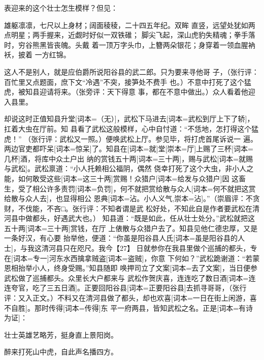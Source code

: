 \documentclass[UTF8,scheme=chinese,11pt,linespread=1.4]{ctexbook}
\makeatletter
\newcommand{\banben}[2][]{#2}
\newenvironment{diben}[1]
  {\list{}{\listparindent 2em
    \itemindent\listparindent
    \rightmargin 0em  %
    \leftmargin 0em  %
    \parsep \z@ \@plus\p@}%
   \item\relax}
  {\endlist}
\makeatother
\begin{document}
\begin{diben}
单表迎来的这个壮士怎生模样？但见：

雄躯凛凛，七尺以上身材；阔面稜稜，二十四五年纪。双眸
直竖，远望处犹如两点明星；两手握来，近觑时好似一双铁碓；
脚尖飞起，深山虎豹失精魂；拳手落时，穷谷熊黑皆丧魄。头戴
着一顶万字头巾，上簪两朵银花；身穿着一领血腥衲袄，披着
一方红锦。

\noindent 这人不是别人，就是应伯爵所说阳谷县的武二郎。只为要来寻他哥
子，（张行评：百忙里又点题面，庶下文“冷遇”不突，接笋处不费手
也。）不意中打死了这个猛虎，被知县迎请将来。（张旁评：天下得意
事，都在不意中做出。）众人看着他迎入县里。

\banben{却说这时正值知县升堂}[词本={（无）}]，\banben{武松下马进去}[词本={武松到厅上下了轿}]，扛着大虫在厅前。知
县看了武松这般模样，心中自忖道：“不恁地，怎打得这个猛虎！”
（张行评：武松又一照。）便唤武松上厅。参见毕，将打虎首尾诉说一
遍。两边官吏都\banben{吓呆}[词本={惊呆}]了。知县\banben{在}[词本={就}]\banben{堂}[崇本={厅}]上赐了\banben{三杯}[词本={几杯}]酒，将库中众土户出
纳的赏钱\banben{五十两}[词本={三十两}]，\banben{赐与武松}[词本={就赐与武松}]。武松禀道：“小人托赖相公福阴，偶然
侥幸打死了这个大虫，非小人之能，如何敢受\banben{这些}[词本={这三十两}]赏赐！\banben{众猎户}[词本={给发与众猎户}]因
这畜生，受了相公许多\banben{责罚}[词本={负罚}]，\banben{何不就把赏给散与众人}[词本={何不就把这赏给散与众人去}]，也显得相公
恩\banben{典}[词本={沾。小人义气},崇本={沾}]。”（崇眉评：不贪财，不伐能，不吝□。张行评：不知者谓是武
松好处，不知此自是作者要武松在清河县中做都头，好遇武大也。）
知县道：“既是如此，任从壮士处分。”武松就把这\banben{五十两}[词本={三十两}]赏钱，在厅
上俵散与众猎户去了。知县见他仁德忠厚，又是一条好汉，有心要
抬举他，便道：“\banben{你虽是阳谷县人氏}[词本={虽是阳谷县的人士}]，与我这清河县只在咫尺。我今【27】
日就参你在我县里做个巡捕的都头，\banben{专在}[词本={专一}]河东水西擒拿\banben{贼盗}[词本={盗贼}]，你意
下何如？”武松跪谢道：“若蒙恩相抬举小人，终身受赐。”知县随即
唤押司\banben{立了文案}[词本={去了文案}]，当日便参武松做了巡捕都头。众里长大户都来与
武松作贺庆喜，\banben{连连吃了数日酒}[词本={连连夸官，吃了三五日酒}]。\banben{正要回阳谷县}[词本={正要阳谷县}]去抓寻哥哥，（张行
评：又入正文。）不料又在清河县做了都头，\banben{却也欢喜}[词本={一日在街上闲游，喜不自胜}]。\banben{那时传得}[词本={传得}]东
平一府两县，皆知武松之名。\banben{正是}[词本={有诗为证}]：

壮士英雄艺略芳，挺身直上景阳岗。

醉来打死山中虎，自此声名播四方。


\end{diben}
\end{document}
